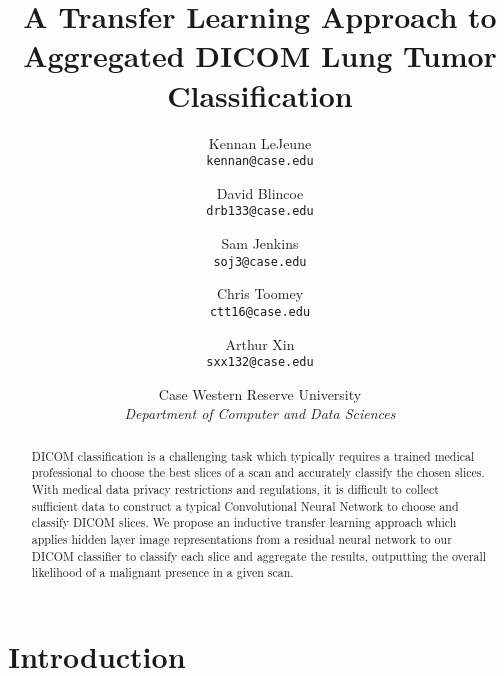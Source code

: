 \documentclass[10pt,twocolumn,letterpaper]{article}
\begin{document}
\title{A Transfer Learning Approach to Aggregated DICOM Lung Tumor Classification}

\author{Kennan LeJeune\\
   {\tt\small kennan@case.edu}
   \and
   David Blincoe\\
   {\tt\small drb133@case.edu}
   \and
   Sam Jenkins\\
   {\tt\small soj3@case.edu}
   \and
   Chris Toomey\\
   {\tt\small ctt16@case.edu}
   \and
   Arthur Xin\\
   {\tt\small sxx132@case.edu}\\
   \and
   {Case Western Reserve University}\\
   {\textit{Department of Computer and Data Sciences}}
}
\maketitle

\begin{abstract}
   DICOM classification is a challenging task which typically requires a trained medical professional to
   choose the best slices of a scan and accurately classify the chosen slices. With medical data privacy restrictions
   and regulations, it is difficult to collect sufficient data to construct a typical Convolutional Neural Network to
   choose and classify DICOM slices. We propose an inductive transfer learning approach which applies hidden layer
   image representations from a residual neural network to our DICOM classifier to classify each slice and aggregate the
   results, outputting the overall likelihood of a malignant presence in a given scan.
\end{abstract}

\section{Introduction} \label{sec:intro}
\end{document}
